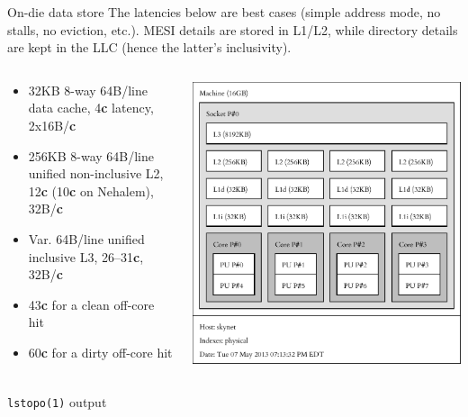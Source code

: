 \documentclass[mathserif,xcolor={dvipsnames,table}]{beamer}
\begin{document}
\begin{frame}{On-die data store}
The latencies below are best cases (simple address mode, no stalls, no eviction, etc.). MESI details are stored
in L1/L2, while directory details are kept in the LLC (hence the latter's
inclusivity).
\vfill
\begin{columns}
\begin{column}{0.5\textwidth}
\begin{itemize}
\item 32KB 8-way 64B/line data cache, 4\textbf{c} latency, 2x16B/\textbf{c}
\item 256KB 8-way 64B/line unified non-inclusive L2, 12\textbf{c} (10\textbf{c} on Nehalem), 32B/\textbf{c}
\item Var. 64B/line unified inclusive L3, 26--31\textbf{c}, 32B/\textbf{c}
\item 43\textbf{c} for a clean off-core hit
\item 60\textbf{c} for a dirty off-core hit
\end{itemize}
\end{column}
\begin{column}{0.5\textwidth}
\includegraphics[scale=.4]{images/skynet.pdf}
\end{column}
\end{columns}
\hfill
\tiny{\texttt{lstopo(1)} output}
\end{frame}
\end{document}
